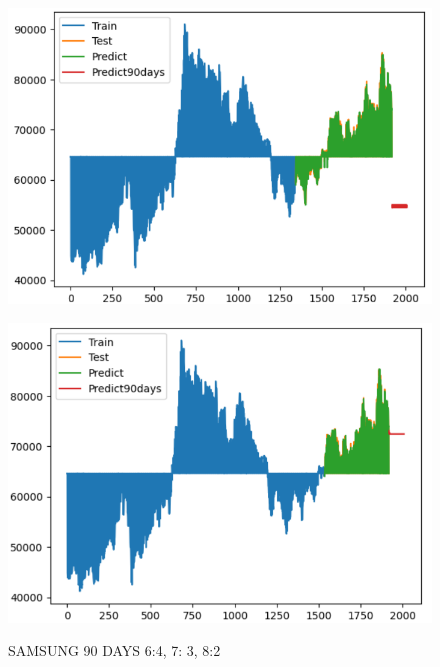 \documentclass{article}
\begin{document}
\begin{multicols}{2}
\begin{figure}[H]
\begin{minipage}{0.15\textwidth}
    \label{fig:1}
    \end{minipage}%
    \begin{minipage}{0.15\textwidth}
    \centering
    \includegraphics[width=1\textwidth]{Image/XGBoost/SAMSUNG_7_3_90.png}
  
    \label{fig:2}
    \end{minipage}%
    \begin{minipage}{0.15\textwidth}
    \centering
    \includegraphics[width=1\textwidth]{Image/XGBoost/SAMSUNG_8_2_90.png}

    \label{fig:3}
    \end{minipage}
    \caption{SAMSUNG 90 DAYS  6:4, 7: 3, 8:2 }
\end{figure}


\end{multicols}
\end{document}
